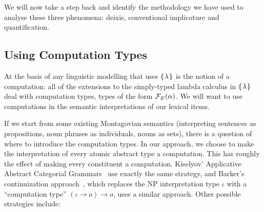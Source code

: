 We will now take a step back and identify the methodology we have used to
analyse these three phenomena: deixis, conventional implicature and
quantification.


\subsection{Using Computation Types}
\label{ssec:methodology-computation-types}

At the basis of any linguistic modelling that uses $\llparenthesis \, \lambda \, \rrparenthesis$ is
the notion of a computation: all of the extensions to the simply-typed
lambda calculus in $\llparenthesis \, \lambda \, \rrparenthesis$ deal with computation types, types of
the form $\mathcal{F}_E(\alpha)$. We will want to use computations in the semantic
interpretations of our lexical items.

If we start from some existing Montagovian semantics (interpreting
sentences as propositions, noun phrases as individuals, nouns as sets),
there is a question of where to introduce the computation types. In our
approach, we choose to make the interpretation of every atomic abstract
type a computation. This has roughly the effect of making every constituent
a computation. Kiselyov' Applicative Abstract Categorial
Grammars~\cite{kiselyov2015applicative,kiselyov2015swing} use exactly the
same strategy, and Barker's continuization
approach~\cite{barker2002continuations}, which replaces the NP
interpretation type $\iota$ with a ``computation type''
$(\iota \to o) \to o$, uses a similar approach. Other possible strategies
include:


